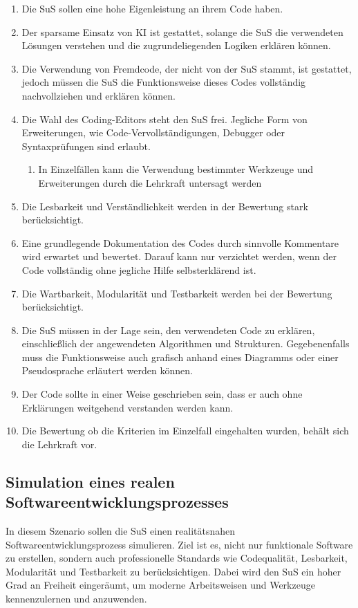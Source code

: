 \documentclass[a4paper,12pt]{article}
\begin{document}
\begin{enumerate}[label=\S\ \arabic*]
    \item Die SuS sollen eine hohe Eigenleistung an ihrem Code haben.
    \item Der sparsame Einsatz von KI ist gestattet, solange die SuS die verwendeten Lösungen verstehen und die zugrundeliegenden Logiken erklären können.
    \item Die Verwendung von Fremdcode, der nicht von der SuS stammt, ist gestattet, jedoch müssen die SuS die Funktionsweise dieses Codes vollständig nachvollziehen und erklären können.
    \item Die Wahl des Coding-Editors steht den SuS frei. Jegliche Form von Erweiterungen, wie Code-Vervollständigungen, Debugger oder Syntaxprüfungen sind erlaubt.
    \begin{enumerate}[label=\S\ \arabic*\alph*]
        \item In Einzelfällen kann die Verwendung bestimmter Werkzeuge und Erweiterungen durch die Lehrkraft untersagt werden
    \end{enumerate}
    \item Die Lesbarkeit und Verständlichkeit werden in der Bewertung stark berücksichtigt.
    \item Eine grundlegende Dokumentation des Codes durch sinnvolle Kommentare wird erwartet und bewertet. Darauf kann nur verzichtet werden, wenn der Code vollständig ohne jegliche Hilfe selbsterklärend ist.
    \item Die Wartbarkeit, Modularität und Testbarkeit werden bei der Bewertung berücksichtigt.
    \item Die SuS müssen in der Lage sein, den verwendeten Code zu erklären, einschließlich der angewendeten Algorithmen und Strukturen. Gegebenenfalls muss die Funktionsweise auch grafisch anhand eines Diagramms oder einer Pseudosprache erläutert werden können.
    \item Der Code sollte in einer Weise geschrieben sein, dass er auch ohne Erklärungen weitgehend verstanden werden kann.
    \item Die Bewertung ob die Kriterien im Einzelfall eingehalten wurden, behält sich die Lehrkraft vor.
\end{enumerate}


\subsection{Simulation eines realen Softwareentwicklungsprozesses}
In diesem Szenario sollen die SuS einen realitätsnahen Softwareentwicklungsprozess simulieren. Ziel ist es, nicht nur funktionale Software zu erstellen, sondern auch professionelle Standards wie Codequalität, Lesbarkeit, Modularität und Testbarkeit zu berücksichtigen. Dabei wird den SuS ein hoher Grad an Freiheit eingeräumt, um moderne Arbeitsweisen und Werkzeuge kennenzulernen und anzuwenden.
\end{document}
